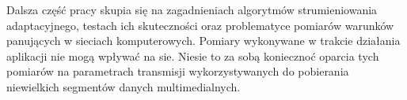 Dalsza część pracy skupia się na zagadnieniach algorytmów strumieniowania adaptacyjnego, testach ich skuteczności oraz problematyce pomiarów warunków panujących w sieciach komputerowych. Pomiary wykonywane w trakcie działania aplikacji nie mogą wpływać na sie. Niesie to za sobą koniecznoć oparcia tych pomiarów na parametrach transmisji wykorzystywanych do pobierania niewielkich segmentów danych multimedialnych. 

